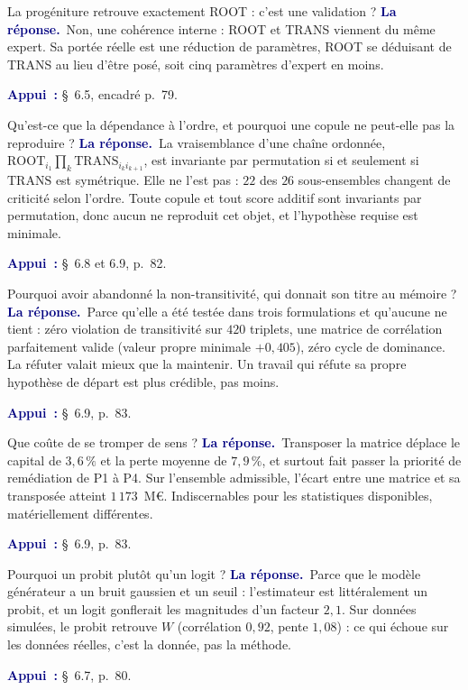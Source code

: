 \documentclass[11pt,a4paper]{article}
\newcommand{\rep}[1]{\smallskip\noindent\textcolor{navy}{\textbf{La réponse.}}\ #1\par}
\newcommand{\appui}[1]{\smallskip\noindent\small\textcolor{navy}{\textbf{Appui~:}} #1\par\normalsize}
\begin{document}
\begin{question}{\og La progéniture retrouve exactement ROOT : c'est une validation ?\fg{}}
\rep{Non, une cohérence interne : ROOT et TRANS viennent du même expert. Sa portée réelle est une
réduction de paramètres, ROOT se déduisant de TRANS au lieu d'être posé, soit cinq paramètres
d'expert en moins.}
\appui{\S~6.5, encadré p.~79.}
\end{question}

\begin{question}{\og Qu'est-ce que la dépendance à l'ordre, et pourquoi une copule ne peut-elle pas la reproduire ?\fg{}}
\rep{La vraisemblance d'une chaîne ordonnée,
$\mathrm{ROOT}_{i_1}\prod_k\mathrm{TRANS}_{i_ki_{k+1}}$, est invariante par permutation si et
seulement si $\mathrm{TRANS}$ est symétrique. Elle ne l'est pas : $22$ des $26$ sous-ensembles
changent de criticité selon l'ordre. Toute copule et tout score additif sont invariants par
permutation, donc aucun ne reproduit cet objet, et l'hypothèse requise est minimale.}
\appui{\S~6.8 et 6.9, p.~82.}
\end{question}

\begin{question}{\og Pourquoi avoir abandonné la non-transitivité, qui donnait son titre au mémoire ?\fg{}}
\rep{Parce qu'elle a été testée dans trois formulations et qu'aucune ne tient : zéro violation de
transitivité sur $420$ triplets, une matrice de corrélation parfaitement valide (valeur propre
minimale $+0{,}405$), zéro cycle de dominance. La réfuter valait mieux que la maintenir. Un travail
qui réfute sa propre hypothèse de départ est plus crédible, pas moins.}
\appui{\S~6.9, p.~83.}
\end{question}

\begin{question}{\og Que coûte de se tromper de sens ?\fg{}}
\rep{Transposer la matrice déplace le capital de $3{,}6\,\%$ et la perte moyenne de $7{,}9\,\%$,
et surtout fait passer la priorité de remédiation de P1 à P4. Sur l'ensemble admissible, l'écart
entre une matrice et sa transposée atteint $1\,173$~M\euro. Indiscernables pour les statistiques
disponibles, matériellement différentes.}
\appui{\S~6.9, p.~83.}
\end{question}

\begin{question}{\og Pourquoi un probit plutôt qu'un logit ?\fg{}}
\rep{Parce que le modèle générateur a un bruit gaussien et un seuil : l'estimateur est
littéralement un probit, et un logit gonflerait les magnitudes d'un facteur $2{,}1$. Sur données
simulées, le probit retrouve $W$ (corrélation $0{,}92$, pente $1{,}08$) : ce qui échoue sur les
données réelles, c'est la donnée, pas la méthode.}
\appui{\S~6.7, p.~80.}
\end{question}
\end{document}
